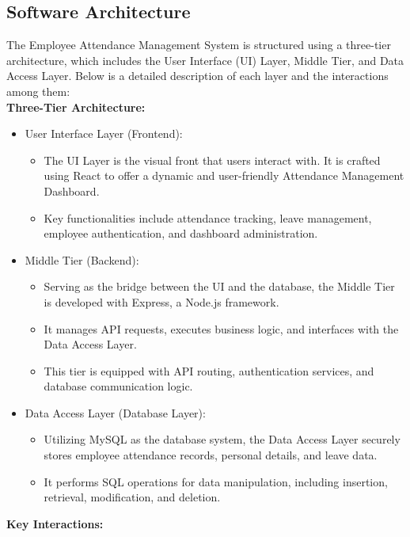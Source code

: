 \documentclass[a4paper, 12pt]{article}
\begin{document}
\subsection{Software Architecture}
The Employee Attendance Management System is structured using a three-tier architecture, which includes the User Interface (UI) Layer, Middle Tier, and Data Access Layer. Below is a detailed description of each layer and the interactions among them:\\
\textbf{Three-Tier Architecture:}
\begin{itemize}
    \item User Interface Layer (Frontend):
    \begin{itemize}
        \item The UI Layer is the visual front that users interact with. It is crafted using React to offer a dynamic and user-friendly Attendance Management Dashboard.
        \item Key functionalities include attendance tracking, leave management, employee authentication, and dashboard administration.
    \end{itemize}
    \newpage
    \item Middle Tier (Backend):
    \begin{itemize}
        \item Serving as the bridge between the UI and the database, the Middle Tier is developed with Express, a Node.js framework.
        \item It manages API requests, executes business logic, and interfaces with the Data Access Layer.
        \item This tier is equipped with API routing, authentication services, and database communication logic.
    \end{itemize}
    \item Data Access Layer (Database Layer):
    \begin{itemize}
        \item Utilizing MySQL as the database system, the Data Access Layer securely stores employee attendance records, personal details, and leave data.
        \item It performs SQL operations for data manipulation, including insertion, retrieval, modification, and deletion.
    \end{itemize}
\end{itemize}
\textbf{Key Interactions:}
\end{document}
